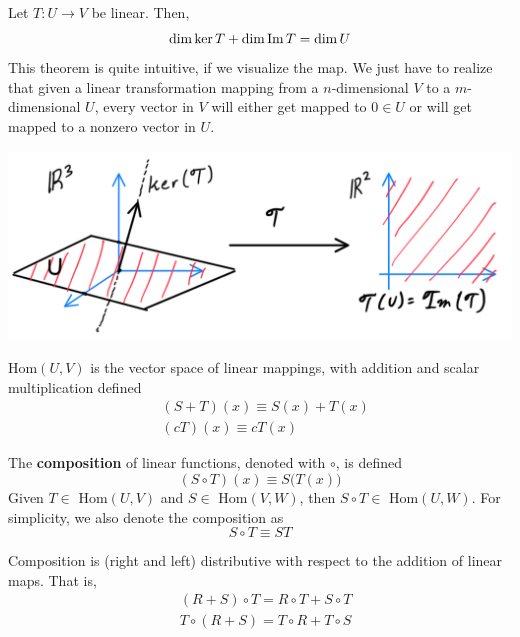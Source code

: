   \begin{theorem}
    Let $T: U \longrightarrow V$ be linear. Then, 
    \begin{equation}
      \dim \ker T + \dim \im T = \dim U
    \end{equation}
    This theorem is quite intuitive, if we visualize the map. We just have to realize that given a linear transformation mapping from a $n$-dimensional $V$ to a $m$-dimensional $U$, every vector in $V$ will either get mapped to $0 \in U$ or will get mapped to a nonzero vector in $U$. 
    \begin{center}
      \includegraphics[scale=0.4]{img/Rank_Nullity.PNG}
    \end{center}
  \end{theorem}

  \begin{proposition}
    Hom$(U, V)$ is the vector space of linear mappings, with addition and scalar multiplication defined
    \begin{align*}
      & (S + T) (x) \equiv S(x) + T(x) \\
      & (c T) (x) \equiv c T(x)
    \end{align*}
  \end{proposition}

  \begin{definition}[Composition]
    The \textbf{composition} of linear functions, denoted with $\circ$, is defined
    \begin{equation}
      (S \circ T) (x) \equiv S\big( T(x)\big)
    \end{equation}
    Given $T \in $ Hom$(U, V)$ and $S \in $ Hom$(V, W)$, then $S \circ T \in $ Hom$(U, W)$. For simplicity, we also denote the composition as 
    \begin{equation}
      S \circ T \equiv S T
    \end{equation}
  \end{definition}

  \begin{proposition}
    Composition is (right and left) distributive with respect to the addition of linear maps. That is, 
    \begin{align*}
      & (R + S) \circ T = R \circ T + S \circ T \\
      & T \circ (R + S) = T \circ R + T \circ S 
    \end{align*}
  \end{proposition}

